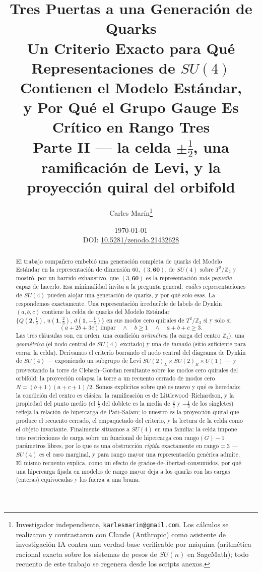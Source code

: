 \documentclass[11pt,a4paper]{article}
\title{\textbf{Tres Puertas a una Generación de Quarks}\\[3pt]
\textbf{Un Criterio Exacto para Qué Representaciones de $SU(4)$ Contienen el Modelo Estándar,\\
y Por Qué el Grupo Gauge Es Crítico en Rango Tres}\\[5pt]
\large\textnormal{Parte II --- la celda $\pm\tfrac12$, una ramificación de Levi, y la
proyección quiral del orbifold}}
\author{Carles Mar\'in\thanks{Investigador independiente, \texttt{karlesmarin@gmail.com}.
Los cálculos se realizaron y contrastaron con Claude (Anthropic) como asistente de
investigación IA contra una verdad-base verificable por máquina (aritmética racional exacta
sobre los sistemas de pesos de $SU(n)$ en SageMath); todo recuento de este trabajo se
regenera desde los scripts anexos.}}
\date{\today\\[2pt]\small DOI: \href{https://doi.org/10.5281/zenodo.21432628}{10.5281/zenodo.21432628}}
\newcommand{\ZZ}{\mathbb{Z}}
\begin{document}
\maketitle

\begin{abstract}
\noindent
El trabajo compañero embebió una generación completa de quarks del Modelo Estándar en la
representación de dimensión $60$, $(3,\mathbf{60})$, de $SU(4)$ sobre $T^2/\mathbb{Z}_2$ y
mostró, por un barrido exhaustivo, que $(3,\mathbf{60})$ es la representación \emph{más
pequeña} capaz de hacerlo. Esa minimalidad invita a la pregunta general: \emph{cuáles}
representaciones de $SU(4)$ pueden alojar una generación de quarks, y por qué solo esas. La
respondemos exactamente. Una representación irreducible de labels de Dynkin $(a,b,c)$
contiene la celda de quarks del Modelo Estándar
$\{Q(\mathbf{2},\tfrac16),\,u(\mathbf{1},\tfrac23),\,d(\mathbf{1},-\tfrac13)\}$ en sus modos
cero quirales de $T^2/\mathbb{Z}_2$ si y solo si
\[
(a+2b+3c)\ \text{impar}\quad\wedge\quad b\ge 1\quad\wedge\quad a+b+c\ge 3 .
\]
Las tres cláusulas son, en orden, una condición \emph{aritmética} (la carga del centro
$\ZZ_4$), una \emph{geométrica} (el nodo central de $SU(4)$ excitado) y una de \emph{tamaño}
(sitio suficiente para cerrar la celda). Derivamos el criterio borrando el nodo central del
diagrama de Dynkin de $SU(4)$ --- exponiendo un subgrupo de Levi
$SU(2)_L\times SU(2)_R\times U(1)$ --- y proyectando la torre de Clebsch--Gordan resultante
sobre los modos cero quirales del orbifold; la proyección colapsa la torre a un recuento
cerrado de modos cero $N=(b+1)(a+c+1)/2$. Somos explícitos sobre qué es nuevo y qué es
heredado: la condición del centro es clásica, la ramificación es de Littlewood--Richardson, y
la propiedad del punto medio (el $\tfrac16$ del doblete es la media de $\tfrac23$ y $-\tfrac13$
de los singletes) refleja la relación de hipercarga de Pati--Salam; lo nuestro es la
proyección quiral que produce el recuento cerrado, el empaquetado del criterio, y la lectura
de la celda como el objeto invariante. Finalmente situamos a $SU(4)$ en una familia: la celda
impone tres restricciones de carga sobre un funcional de hipercarga con $\mathrm{rango}(G)-1$
parámetros libres, por lo que es una obstrucción \emph{rígida} exactamente en
$\mathrm{rango}=3$ --- $SU(4)$ es el caso marginal, y para rango mayor una representación
genérica admite. El mismo recuento explica, como un efecto de grados-de-libertad-consumidos,
por qué una hipercarga fijada en modelos de rango mayor deja a los quarks con las cargas
(enteras) equivocadas y los fuerza a una brana.
\end{abstract}
\end{document}
